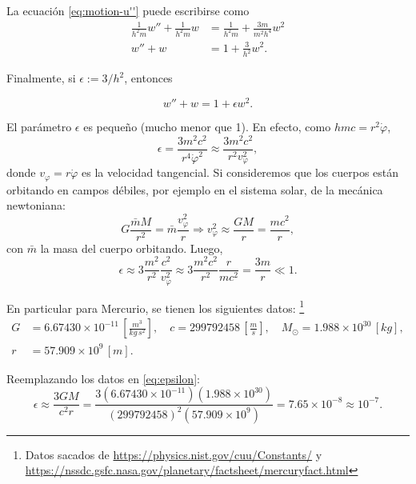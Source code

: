 \documentclass[letterpaper,11pt]{article}
\begin{document}
La ecuación \eqref{eq:motion-u''} puede escribirse como
\begin{align}
\frac{1}{h^2m} w'' + \frac{1}{h^2m} w &= \frac{1}{h^2m} + \frac{3m}{m^2h^4} w^2 \\
w'' + w &= 1 + \frac{3}{h^2} w^2.
\end{align}

Finalmente, si $\epsilon:= 3/h^2$, entonces 
\begin{shaded}
\begin{equation} \label{eq:motion-w''}
w'' + w = 1 + \epsilon w^2.
\end{equation}
\end{shaded}

El parámetro $\epsilon$ es pequeño (mucho menor que 1). En efecto, como $hmc = r^2 \dot{\varphi}$, 
\begin{equation}
\epsilon = \frac{3 m^2c^2}{r^4\dot{\varphi}^2} \approx \frac{3m^2c^2}{r^2 v_{\varphi}^2},
\end{equation}
donde $v_{\varphi} = r \dot{\varphi}$ es la velocidad tangencial. Si consideremos que los cuerpos están orbitando en campos débiles, por ejemplo en el sistema solar, de la mecánica newtoniana:
\begin{equation}
G \frac{\bar{m} M}{r^2} = \bar{m} \frac{v_{\varphi}^2}{r} \Rightarrow v_{\varphi}^2 \approx \frac{G M}{r} = \frac{mc^2}{r},
\end{equation}
con $\bar{m}$ la masa del cuerpo orbitando. Luego,
\begin{equation} \label{eq:epsilon}
\epsilon \approx 3 \frac{m^2}{r^2} \frac{c^2}{v_{\varphi}^2} \approx 3 \frac{m^2c^2}{r^2} \frac{r}{mc^2} = \frac{3m}{r} \ll 1. 
\end{equation}

En particular para Mercurio, se tienen los siguientes datos: \footnote{Datos sacados de \url{
https://physics.nist.gov/cuu/Constants/} y \url{https://nssdc.gsfc.nasa.gov/planetary/factsheet/mercuryfact.html}}
\begin{align}
G &= 6.67430 \times 10^{-11} \,\left[ \frac{m^3}{kg \,s^2} \right], \quad  c =  299 792 458 \,\left[ \frac{m}{s}\right], \quad  M_{\odot} = 1.988 \times 10^{30} \,[kg], \label{eq:mercury-data}\\
 r &= 57.909 \times 10^{9} \,[m]. 
\end{align}

Reemplazando los datos en \eqref{eq:epsilon}:
\begin{equation}
\epsilon \approx \frac{3 GM}{c^2r} =  \frac{3(6.67430 \times 10^{-11} ) ( 1.988 \times 10^{30})}{(299 792 458)^2( 57.909 \times 10^{9})} = 7.65 \times 10^{-8} \approx 10^{-7}.
\end{equation}
\end{document}
